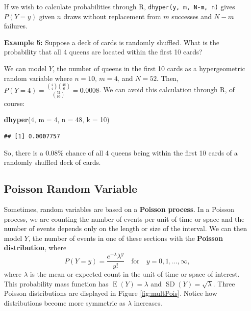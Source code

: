 \documentclass[
]{krantz}
\newenvironment{Shaded}{\begin{snugshade}}{\end{snugshade}}
\newcommand{\DataTypeTok}[1]{\textcolor[rgb]{0.27,0.27,0.27}{#1}}
\newcommand{\DecValTok}[1]{\textcolor[rgb]{0.06,0.06,0.06}{#1}}
\newcommand{\KeywordTok}[1]{\textcolor[rgb]{0.27,0.27,0.27}{\textbf{#1}}}
\newcommand{\NormalTok}[1]{#1}
\newcommand{\E}{\operatorname{E}}
\newcommand{\SD}{\operatorname{SD}}
\begin{document}
If we wish to calculate probabilities through R, \texttt{dhyper(y,\ m,\ N-m,\ n)} gives \(P(Y=y)\) given \(n\) draws without replacement from \(m\) successes and \(N-m\) failures.

\textbf{Example 5:} Suppose a deck of cards is randomly shuffled. What is the probability that all 4 queens are located within the first 10 cards?

We can model \(Y\), the number of queens in the first 10 cards as a hypergeometric random variable where \(n = 10\), \(m = 4\), and \(N = 52\). Then, \(P(Y=4) = \displaystyle \frac{\binom{4}{4}\binom{48}{6}}{\binom{52}{10}} = 0.0008\). We can avoid this calculation through R, of course:

\begin{Shaded}
\begin{Highlighting}[]
\KeywordTok{dhyper}\NormalTok{(}\DecValTok{4}\NormalTok{, }\DataTypeTok{m =} \DecValTok{4}\NormalTok{, }\DataTypeTok{n =} \DecValTok{48}\NormalTok{, }\DataTypeTok{k =} \DecValTok{10}\NormalTok{)}
\end{Highlighting}
\end{Shaded}

\begin{verbatim}
## [1] 0.0007757
\end{verbatim}

So, there is a 0.08\% chance of all 4 queens being within the first 10 cards of a randomly shuffled deck of cards.

\hypertarget{poisson-random-variable}{%
\subsection{Poisson Random Variable}\label{poisson-random-variable}}

Sometimes, random variables are based on a \textbf{Poisson process}. In a Poisson process, we are counting the number of events per unit of time or space and the number of events depends only on the length or size of the interval.
We can then model \(Y\), the number of events in one of these sections with the \textbf{Poisson distribution}, where
\begin{equation}
P(Y=y) = \frac{e^{-\lambda}\lambda^y}{y!} \quad \textrm{for} \quad y = 0, 1, \ldots, \infty,
\label{eq:poissRV}
\end{equation}
where \(\lambda\) is the mean or expected count in the unit of time or space of interest.
This probability mass function has \(\E(Y) = \lambda\) and \(\SD(Y) = \sqrt{\lambda}\). Three Poisson distributions are displayed in Figure \ref{fig:multPois}. Notice how distributions become more symmetric as \(\lambda\) increases.
\end{document}
